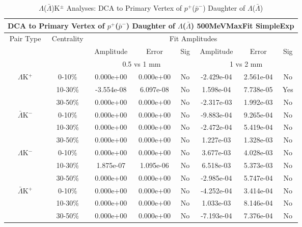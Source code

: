 \documentclass[../AnalysisNoteJBuxton.tex]{subfiles}
\begin{document}
\begin{table}
 \centering
 \begin{tabular}{|c|c|c|c|c||c|c|c|}
  \multicolumn{8}{c}{DCA to Primary Vertex of $p^{+}$($\bar{p}^{-}$) Daughter of $\Lambda$($\bar{\Lambda}$) 500MeVMaxFit SimpleExp} \\
  \hline
  \multirow{3}{*}{Pair Type} & \multirow{3}{*}{Centrality} & \multicolumn{6}{c|}{Fit Amplitudes} \\
  \cline{3-8}
   & & Amplitude & Error & Sig & Amplitude & Error & Sig \\  
  \cline{3-8}
   & & \multicolumn{3}{c||}{0.5 vs 1 mm} & \multicolumn{3}{c|}{1 vs 2 mm} \\  
  \hline
  \multirow{3}{*}{$\Lambda$K$^{+}$}
   &  0-10\% & 0.000e+00 & 0.000e+00 & No & -2.429e-04 & 2.561e-04 & No \\
   & 10-30\% & -3.554e-08 & 6.097e-08 & No & 1.598e-04 & 7.738e-05 & Yes \\
   & 30-50\% & 0.000e+00 & 0.000e+00 & No & -2.317e-03 & 1.992e-03 & No \\
  \hline
  \multirow{3}{*}{$\bar{\Lambda}$K$^{-}$}
   &  0-10\% & 0.000e+00 & 0.000e+00 & No & -9.883e-04 & 9.265e-04 & No \\
   & 10-30\% & 0.000e+00 & 0.000e+00 & No & -2.472e-04 & 5.419e-04 & No \\
   & 30-50\% & 0.000e+00 & 0.000e+00 & No & 1.227e-03 & 1.328e-03 & No \\
  \hline \hline
  \multirow{3}{*}{$\Lambda$K$^{-}$}
   &  0-10\% & 0.000e+00 & 0.000e+00 & No & 3.677e-03 & 4.028e-03 & No \\
   & 10-30\% & 1.875e-07 & 1.095e-06 & No & 6.518e-03 & 5.373e-03 & No \\
   & 30-50\% & 0.000e+00 & 0.000e+00 & No & -2.985e-04 & 5.747e-04 & No \\
  \hline
  \multirow{3}{*}{$\bar{\Lambda}$K$^{+}$}
   &  0-10\% & 0.000e+00 & 0.000e+00 & No & -4.252e-04 & 3.414e-04 & No \\
   & 10-30\% & 0.000e+00 & 0.000e+00 & No & 1.033e-03 & 8.146e-04 & No \\
   & 30-50\% & 0.000e+00 & 0.000e+00 & No & -7.193e-04 & 7.376e-04 & No \\
  \hline
 \end{tabular}
 \caption{$\Lambda$($\bar{\Lambda}$)K$^{\pm}$ Analyses: DCA to Primary Vertex of $p^{+}$($\bar{p}^{-}$) Daughter of $\Lambda$($\bar{\Lambda}$)}
 \label{tab:DcaToPrimVertexProtonDaughtOfLamLamKch_500MeVMaxFit_SimpleExp}
\end{table}
\end{document}
